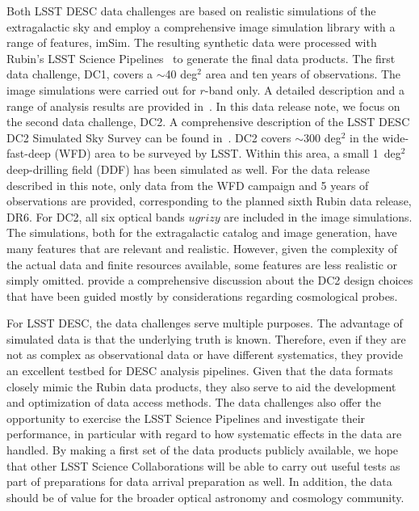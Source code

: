\documentclass[modern]{descnote}
\begin{document}
Both LSST DESC data challenges are based on realistic simulations of the extragalactic sky and employ a comprehensive image simulation library with a range of features, imSim. The resulting synthetic data were processed with Rubin's LSST Science Pipelines~\citep{2017ASPC..512..279J} to generate the final data products. The first data challenge, DC1, covers a $\sim$40 deg$^2$ area and ten years of observations. The image simulations were carried out for $r$-band only. A detailed description and a range of analysis results are provided in~\cite{dc1}.  In this data release note, we focus on the second data challenge, DC2. A comprehensive description of the LSST DESC DC2 Simulated Sky Survey can be found in~\cite{2020arXiv201005926L}. DC2 covers $\sim$300 deg$^2$ in the wide-fast-deep (WFD) area to be surveyed by LSST. Within this area, a small 1~deg$^2$ deep-drilling field (DDF) has been simulated as well. For the data release described in this note, only data from the WFD campaign and 5 years of observations are provided, corresponding to the planned sixth Rubin data release, DR6. For DC2, all six optical bands $ugrizy$ are included in the image simulations. The simulations, both for the extragalactic catalog and image generation, have many features that are relevant and realistic. However, given the complexity of the actual data and finite resources available, some features are less realistic or simply omitted. \cite{2020arXiv201005926L} provide a comprehensive discussion about the DC2 design choices that have been guided mostly by considerations regarding cosmological probes.  

For LSST DESC, the data challenges serve multiple purposes. The advantage of simulated data is that the underlying truth is known. Therefore, even if they are not as complex as observational data or have different systematics, they provide an excellent testbed for DESC analysis pipelines. Given that the data formats closely mimic the Rubin data products, they also serve to aid the development and optimization of data access methods. The data challenges also offer the opportunity to exercise the LSST Science Pipelines and investigate their performance, in particular with regard to how systematic effects in the data are handled. By making a first set of the data products publicly available, we hope that other LSST Science Collaborations will be able to carry out useful tests as part of preparations for data arrival preparation as well. In addition, the data should be of value for the broader optical astronomy and cosmology community.
\end{document}
